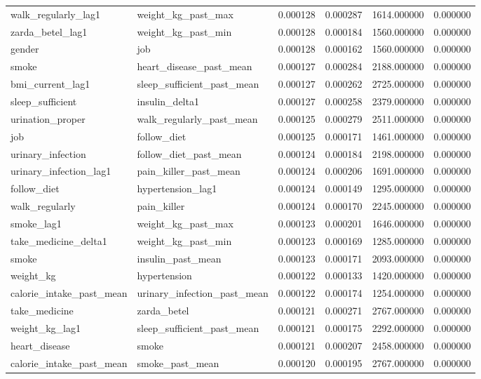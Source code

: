\begin{longtable}{llrrrr}
walk\_regularly\_lag1 & weight\_kg\_past\_max & 0.000128 & 0.000287 & 1614.000000 & 0.000000 \\
zarda\_betel\_lag1 & weight\_kg\_past\_min & 0.000128 & 0.000184 & 1560.000000 & 0.000000 \\
gender & job & 0.000128 & 0.000162 & 1560.000000 & 0.000000 \\
smoke & heart\_disease\_past\_mean & 0.000127 & 0.000284 & 2188.000000 & 0.000000 \\
bmi\_current\_lag1 & sleep\_sufficient\_past\_mean & 0.000127 & 0.000262 & 2725.000000 & 0.000000 \\
sleep\_sufficient & insulin\_delta1 & 0.000127 & 0.000258 & 2379.000000 & 0.000000 \\
urination\_proper & walk\_regularly\_past\_mean & 0.000125 & 0.000279 & 2511.000000 & 0.000000 \\
job & follow\_diet & 0.000125 & 0.000171 & 1461.000000 & 0.000000 \\
urinary\_infection & follow\_diet\_past\_mean & 0.000124 & 0.000184 & 2198.000000 & 0.000000 \\
urinary\_infection\_lag1 & pain\_killer\_past\_mean & 0.000124 & 0.000206 & 1691.000000 & 0.000000 \\
follow\_diet & hypertension\_lag1 & 0.000124 & 0.000149 & 1295.000000 & 0.000000 \\
walk\_regularly & pain\_killer & 0.000124 & 0.000170 & 2245.000000 & 0.000000 \\
smoke\_lag1 & weight\_kg\_past\_max & 0.000123 & 0.000201 & 1646.000000 & 0.000000 \\
take\_medicine\_delta1 & weight\_kg\_past\_min & 0.000123 & 0.000169 & 1285.000000 & 0.000000 \\
smoke & insulin\_past\_mean & 0.000123 & 0.000171 & 2093.000000 & 0.000000 \\
weight\_kg & hypertension & 0.000122 & 0.000133 & 1420.000000 & 0.000000 \\
calorie\_intake\_past\_mean & urinary\_infection\_past\_mean & 0.000122 & 0.000174 & 1254.000000 & 0.000000 \\
take\_medicine & zarda\_betel & 0.000121 & 0.000271 & 2767.000000 & 0.000000 \\
weight\_kg\_lag1 & sleep\_sufficient\_past\_mean & 0.000121 & 0.000175 & 2292.000000 & 0.000000 \\
heart\_disease & smoke & 0.000121 & 0.000207 & 2458.000000 & 0.000000 \\
calorie\_intake\_past\_mean & smoke\_past\_mean & 0.000120 & 0.000195 & 2767.000000 & 0.000000 \\

\end{longtable}
